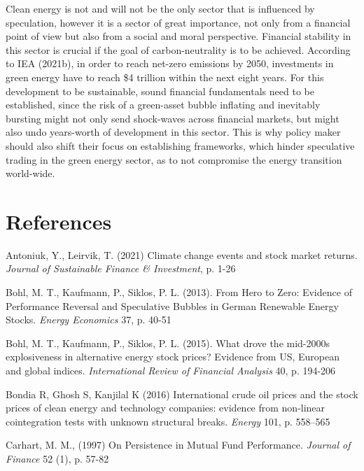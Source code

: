 \documentclass[11pt]{article}
\begin{document}
Clean energy is not and will not be the only sector that is influenced by speculation, however it is a sector of great importance, not only from a financial point of view but also from a social and moral perspective. Financial stability in this sector is crucial if the goal of carbon-neutrality is to be achieved. According to IEA (2021b), in order to reach net-zero emissions by 2050, investments in green energy have to reach \$4 trillion within the next eight years. For this development to be sustainable, sound financial fundamentals need to be established, since the risk of a green-asset bubble inflating and inevitably bursting might not only send shock-waves across financial markets, but might also undo years-worth of development in this sector. This is why policy maker should also shift their focus on establishing frameworks, which hinder speculative trading in the green energy sector, as to not compromise the energy transition world-wide. 

\newpage
\section{References}

Antoniuk, Y., Leirvik, T. (2021) Climate change events and stock market returns. \textit{Journal of Sustainable Finance \& Investment}, p. 1-26
\newline

Bohl, M. T., Kaufmann, P., Siklos, P. L. (2013). From Hero to Zero: Evidence of
Performance Reversal and Speculative Bubbles in German Renewable Energy Stocks.
\textit{Energy Economics} 37, p. 40-51
\newline

Bohl, M. T., Kaufmann, P., Siklos, P. L. (2015). What drove the mid-2000s explosiveness in alternative energy stock prices? Evidence from US, European and global indices.
\textit{International Review of Financial Analysis} 40, p. 194-206
\newline

Bondia R, Ghosh S, Kanjilal K (2016) International crude oil prices and the stock prices of clean energy and technology companies: evidence from non-linear cointegration tests with unknown structural breaks. \textit{Energy} 101, p. 558–565
\newline

Carhart, M. M., (1997) On Persistence in Mutual Fund Performance. \textit{Journal of Finance} 52 (1), p. 57-82
\newline
\end{document}
